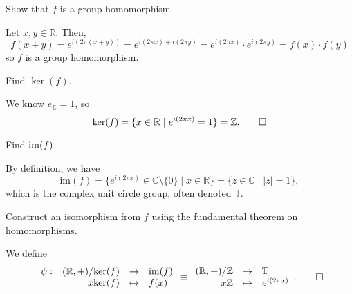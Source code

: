 \begin{exer}
Show that $ f $ is a group homomorphism.
\end{exer}
\begin{sltn}
Let $ x,y\in\mathbb{R} $. Then,
\begin{equation*}
    f(x+y)=e^{i(2\pi(x+y))}=e^{i(2\pi x)+i(2\pi y)}=e^{i(2\pi x)}\cdot e^{i(2\pi y)}=f(x)\cdot f(y)
\end{equation*}
so $ f $ is a group homomorphism.
\end{sltn}

\begin{exer}
Find $ \ker(f) $.
\end{exer}
\begin{sltn}
We know $ e_{\mathbb{C}}=1 $, so
\begin{equation*}
    \mathrm{ker}(f)=\{x\in\mathbb{R}\mid e^{i(2\pi x)}=1\}=\mathbb{Z}.\qedhere
\end{equation*}
\end{sltn}

\begin{exer}
Find $ \operatorname{im}(f) $.
\end{exer}
\begin{sltn}
By definition, we have
\begin{equation*}
    \mathrm{im}(f)=\{e^{i(2\pi x)}\in\mathbb{C}\setminus\{0\}\mid x\in\mathbb{R}\}=\{z\in\mathbb{C}\mid\lvert z\rvert=1\},
\end{equation*}
which is the complex unit circle group, often denoted $ \mathbb{T} $.
\end{sltn}

\begin{exer}
Construct an isomorphism from $ f $ using the fundamental theorem on homomorphisms.
\end{exer}
\begin{sltn}
We define
\begin{equation*}
    \begin{array}{rrcl}
        \psi: & (\mathbb{R},+)/\mathrm{ker}(f) & \to & \mathrm{im}(f) \\
        & x\mathrm{ker}(f) & \mapsto & f(x) 
    \end{array}
    \equiv
    \begin{array}{rcl}
        (\mathbb{R},+)/\mathbb{Z} & \to & \mathbb{T} \\
        x\mathbb{Z} & \mapsto & e^{i(2\pi x)}
    \end{array}.\qedhere
\end{equation*}
\end{sltn}

